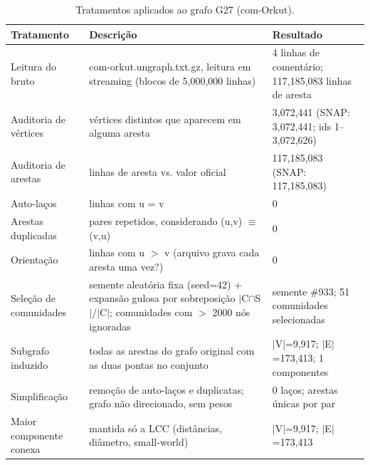 \begin{table}[ht]
\centering
\caption{Tratamentos aplicados ao grafo G27 (com-Orkut).}
\label{tab:tratamentos}
\small
\begin{tabular}{p{3cm}p{6cm}p{4.5cm}}
\hline
Tratamento & Descrição & Resultado \\
\hline
Leitura do bruto & com-orkut.ungraph.txt.gz, leitura em streaming (blocos de 5,000,000 linhas) & 4 linhas de comentário; 117,185,083 linhas de aresta \\
Auditoria de vértices & vértices distintos que aparecem em alguma aresta & 3,072,441 (SNAP: 3,072,441; ids 1--3,072,626) \\
Auditoria de arestas & linhas de aresta vs. valor oficial & 117,185,083 (SNAP: 117,185,083) \\
Auto-laços & linhas com u = v & 0 \\
Arestas duplicadas & pares repetidos, considerando (u,v) $\equiv$ (v,u) & 0 \\
Orientação & linhas com u $>$ v (arquivo grava cada aresta uma vez?) & 0 \\
Seleção de comunidades & semente aleatória fixa (seed=42) + expansão gulosa por sobreposição $|$C$\cap$S$|$/$|$C$|$; comunidades com $>$ 2000 nós ignoradas & semente \#933; 51 comunidades selecionadas \\
Subgrafo induzido & todas as arestas do grafo original com as duas pontas no conjunto & $|$V$|$=9,917; $|$E$|$=173,413; 1 componentes \\
Simplificação & remoção de auto-laços e duplicatas; grafo não direcionado, sem pesos & 0 laços; arestas únicas por par \\
Maior componente conexa & mantida só a LCC (distâncias, diâmetro, small-world) & $|$V$|$=9,917; $|$E$|$=173,413 \\
\hline
\end{tabular}
\end{table}
